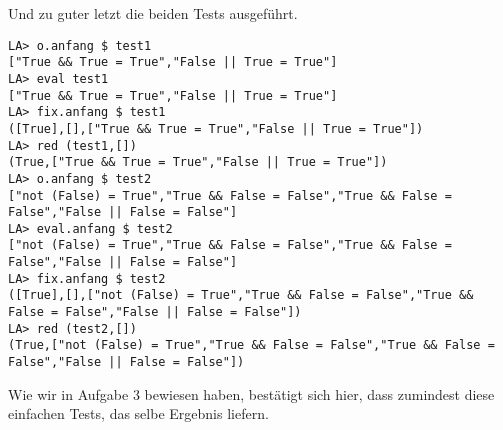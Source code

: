 \documentclass[11pt,a4paper,ngerman]{article}
\begin{document}
\begin{enumerate}[a)]
            Und zu guter letzt die beiden Tests ausgeführt.
            \begin{lstlisting}
LA> o.anfang $ test1
["True && True = True","False || True = True"]
LA> eval test1
["True && True = True","False || True = True"]
LA> fix.anfang $ test1
([True],[],["True && True = True","False || True = True"])
LA> red (test1,[])
(True,["True && True = True","False || True = True"])
LA> o.anfang $ test2
["not (False) = True","True && False = False","True && False = False","False || False = False"]
LA> eval.anfang $ test2
["not (False) = True","True && False = False","True && False = False","False || False = False"]
LA> fix.anfang $ test2
([True],[],["not (False) = True","True && False = False","True && False = False","False || False = False"])
LA> red (test2,[])
(True,["not (False) = True","True && False = False","True && False = False","False || False = False"])
            \end{lstlisting}

            Wie wir in Aufgabe 3 bewiesen haben, bestätigt sich hier, dass zumindest diese einfachen
            Tests, das selbe Ergebnis liefern.
 
\end{enumerate}
\label{LastPage}
\end{document}
